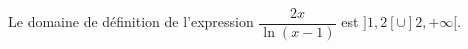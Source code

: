 Le domaine de définition de l'expression $\dfrac{2x}{\ln(x-1)}$ est $]1,2[\cup]2,+\infty[$.

\begin{reponses}
\end{reponses}

